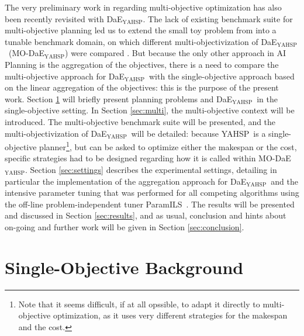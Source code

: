 \documentclass{llncs}
\def\dae{{\em Divide-and-Evolve}}
\newcommand{\DAEYAHSP}{{\sc DaE$_{\text{YAHSP}}$}}
\def\YAHSP{{\sc YAHSP}}
\def\PARAMILS{{\sc ParamILS}}
\def\MODAEYAHSP{{\sc MO-DaE$_{\text{YAHSP}}$}}
\begin{document}
The very preliminary work in \cite{evoCOP2006} regarding multi-objective optimization has also been recently revisited with \DAEYAHSP. The lack of existing benchmark suite for multi-objective planning led us to extend the small toy problem from \cite{evoCOP2006} into a tunable benchmark domain, on which different multi-objectivization of \DAEYAHSP\ (\MODAEYAHSP) were compared \cite{nous-emo2013}. But because the only other approach in AI Planning is the aggregation of the objectives, there is a need to compare the multi-objective approach for \DAEYAHSP\ with the single-objective approach based on the linear aggregation of the objectives: this is the purpose of the present work.
Section \ref{sec:DAE} will briefly present planning problems and \DAEYAHSP\ in the single-objective setting. In Section \ref{sec:multi}, the multi-objective context will be introduced. The multi-objective benchmark suite will be presented, and the multi-objectivization of \DAEYAHSP\ will be detailed: because \YAHSP\ is a single-objective planner\footnote{Note that it seems difficult, if at all opssible, to adapt it directly to multi-objective optimization, as it uses very different strategies for the makespan and the cost.}, but can be asked to optimize either the makespan or the cost, specific strategies had to be designed regarding how it is called within \MODAEYAHSP. Section \ref{sec:settings} describes the experimental settings, detailing in particular the implementation of the aggregation approach for \DAEYAHSP\ and the intensive parameter tuning that was performed for all competing algorithms using the off-line problem-independent tuner \PARAMILS\ \cite{ParamILS-JAIR}. The results will be presented and 
discussed in Section \ref{sec:results}, and as usual, conclusion and hints about on-going and further work will be given in Section \ref{sec:conclusion}.

\section{Single-Objective Background}
\label{sec:DAE}
\end{document}
